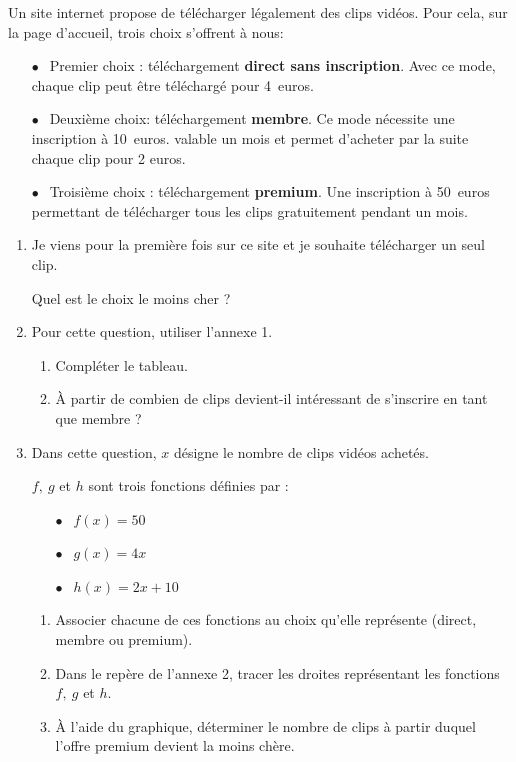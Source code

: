 
\medskip

Un site internet propose de télécharger légalement des clips vidéos. Pour cela, sur la page d'accueil, trois choix s'offrent à nous:

\setlength\parindent{8mm}
\begin{itemize}
\item[$\bullet~~$] Premier choix : téléchargement \textbf{direct sans inscription}. Avec ce mode, chaque clip peut être téléchargé pour 4~euros.
\item[$\bullet~~$] Deuxième choix: téléchargement \textbf{membre}. Ce mode nécessite une inscription à 10~euros.
valable un mois et permet d'acheter par la suite chaque clip pour 2 euros.
\item[$\bullet~~$] Troisième choix : téléchargement \textbf{premium}. Une inscription à 50~euros permettant de télécharger tous les clips gratuitement pendant un mois.
\end{itemize}
\setlength\parindent{0mm}

\medskip

\begin{enumerate}
\item Je viens pour la première fois sur ce site et je souhaite télécharger un seul clip.

Quel est le choix le moins cher ?
\item Pour cette question, utiliser l'annexe 1.
	\begin{enumerate}
		\item Compléter le tableau.
		\item À partir de combien de clips devient-il intéressant de s'inscrire en tant que membre ?
	\end{enumerate}
\item Dans cette question, $x$ désigne le nombre de clips vidéos achetés.
	
$f,\: g$ et $h$ sont trois fonctions définies par :
	
\setlength\parindent{8mm}
\begin{itemize}
\item[$\bullet~~$]$f(x) = 50$
\item[$\bullet~~$]$g(x) = 4x$
\item[$\bullet~~$]$h(x) = 2x + 10$
\end{itemize}
\setlength\parindent{0mm}

	\begin{enumerate}
		\item Associer chacune de ces fonctions au choix qu'elle représente (direct, membre ou premium).
		\item Dans le repère de l'annexe 2, tracer les droites représentant les fonctions $f,\: g$ et $h$.
		\item À l'aide du graphique, déterminer le nombre de clips à partir duquel l'offre premium devient la moins chère.
	\end{enumerate}
\end{enumerate}

